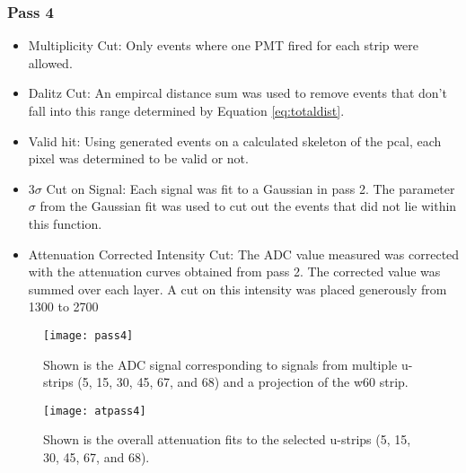 \clearpage
\FloatBarrier
\subsubsection{Pass 4}
\begin{itemize}
    \item Multiplicity Cut: Only events where one PMT fired for each strip were allowed.
    \item Dalitz Cut: An empircal distance sum was used to remove events that don't fall into this range determined by Equation \ref{eq:totaldist}.
    \item Valid hit: Using generated events on a calculated skeleton of the pcal, each pixel was determined to be valid or not.
    \item 3$\sigma$ Cut on Signal: Each signal was fit to a Gaussian in pass 2. The parameter $\sigma$ from the Gaussian fit was used to cut out the events that did not lie within this function.
    \item Attenuation Corrected Intensity Cut: The ADC value measured was corrected with the attenuation curves obtained from pass 2. The corrected value was summed over each layer. A cut on this intensity was placed generously from 1300 to 2700
\end{itemize}


\begin{figure}[h]
    \centering
    \texttt{[image: pass4]}
    \caption{Shown is the ADC signal corresponding to signals from multiple u-strips (5, 15, 30, 45, 67, and 68) and a projection of the w60 strip.}
    \label{fig:pass4}
\end{figure}

\begin{figure}[h]
    \centering
    \texttt{[image: atpass4]}
    \caption{Shown is the overall attenuation fits to the selected u-strips (5, 15, 30, 45, 67, and 68).}
    \label{fig:atpass4}
\end{figure}


\clearpage
\FloatBarrier
